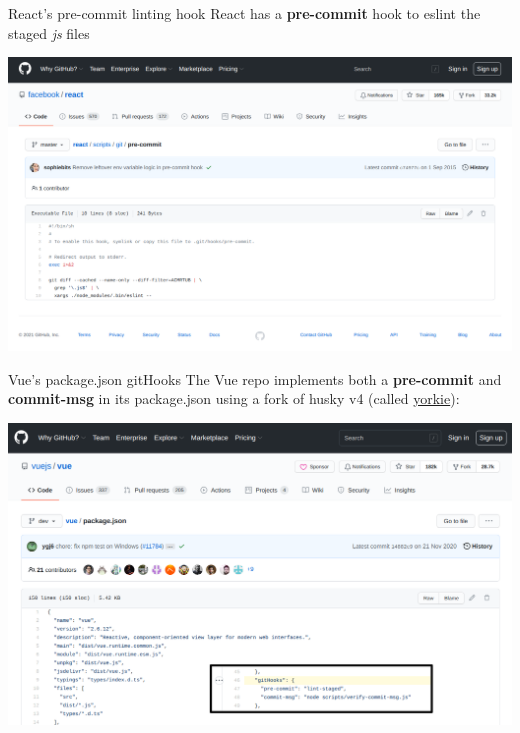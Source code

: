 \documentclass[11pt]{beamer}
\begin{document}
\begin{frame}{React's pre-commit linting hook}
  React has a \textbf{pre-commit} hook to eslint the staged \textit{js} files
  \begin{center}
   \href{https://github.com/facebook/react/blob/master/scripts/git/pre-commit}{
      \includegraphics[scale=0.2]{react-pre-commit.png}
   }
  \end{center}
\end{frame}


\begin{frame}{Vue's package.json gitHooks}
  The Vue repo implements both a \textbf{pre-commit} and \textbf{commit-msg} in its package.json using a fork of husky v4 (called
  {\color{purple} \href{https://github.com/yyx990803/yorkie}{yorkie}}):

  \begin{center}
   \href{https://github.com/vuejs/vue/blob/dev/package.json\#L46}{
      \includegraphics[scale=0.2]{vue-githooks.png}
   }
  \end{center}
\end{frame}
\end{document}
